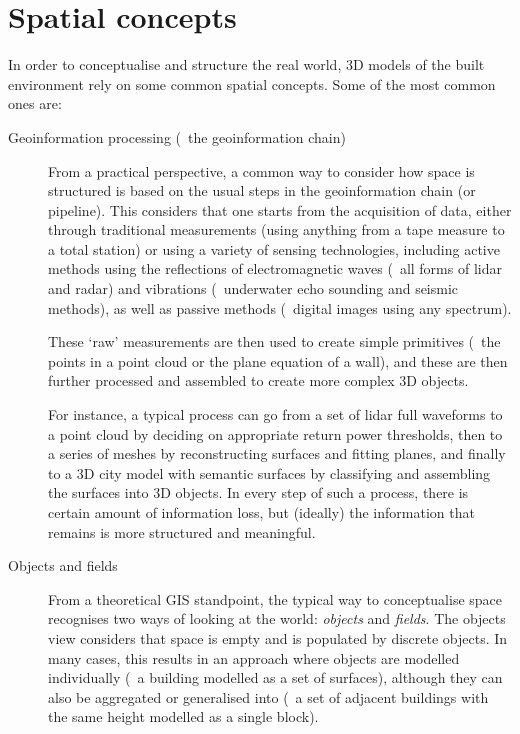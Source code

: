 \section{Spatial concepts}

In order to conceptualise and structure the real world, 3D models of the built environment rely on some common spatial concepts.
Some of the most common ones are:

\begin{description}

\item[Geoinformation processing (\ie\ the geoinformation chain)]
From a practical perspective, a common way to consider how space is structured is based on the usual steps in the geoinformation chain (or pipeline).
This considers that one starts from the acquisition of data, either through traditional measurements (using anything from a tape measure to a total station) or using a variety of sensing technologies, including active methods using the reflections of electromagnetic waves (\eg\ all forms of lidar and radar) and vibrations (\eg\ underwater echo sounding and seismic methods), as well as passive methods (\eg\ digital images using any spectrum).

These `raw' measurements are then used to create simple primitives (\eg\ the points in a point cloud or the plane equation of a wall), and these are then further processed and assembled to create more complex 3D objects.

For instance, a typical process can go from a set of lidar full waveforms to a point cloud by deciding on appropriate return power thresholds, then to a series of meshes by reconstructing surfaces and fitting planes, and finally to a 3D city model with semantic surfaces by classifying and assembling the surfaces into 3D objects.
In every step of such a process, there is certain amount of information loss, but (ideally) the information that remains is more structured and meaningful.

\item[Objects and fields]
From a theoretical GIS standpoint, the typical way to conceptualise space recognises two ways of looking at the world: \emph{objects} and \emph{fields}.
The objects view considers that space is empty and is populated by discrete objects.
In many cases, this results in an approach where objects are modelled individually (\eg\ a building modelled as a set of surfaces), although they can also be aggregated or generalised into (\eg\ a set of adjacent buildings with the same height modelled as a single block).


\end{description}

